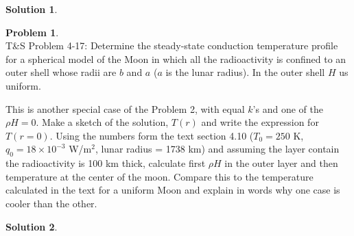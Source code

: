 \documentclass[titlepage, 11pt]{article}
\theoremstyle{definition}
\newtheorem{problem}{Problem}
\newtheorem*{solution}{Solution}
\begin{document}
\begin{solution}

\end{solution}

\newpage

\begin{problem}\ \\
T\&S Problem 4-17: Determine the steady-state conduction temperature profile for a spherical model of the Moon in which all the radioactivity is confined to an outer shell whose radii are $b$ and $a$ ($a$ is the lunar radius). In the outer shell $H$ us uniform.\vspace{\baselineskip}

\noindent
This is another special case of the Problem 2, with equal $k$'s and one of the $\rho H = 0$. Make a sketch of the solution, $T(r)$ and write the expression for $T(r = 0)$. Using the numbers form the text section 4.10 ($T_0 = 250$ K, $q_0 = 18\times{10}^{-3}$ W/m$^{2}$, lunar radius = 1738 km) and assuming the layer contain the radioactivity is 100 km thick, calculate first $\rho H$ in the outer layer and then temperature at the center of the moon. Compare this to the temperature calculated in the text for a uniform Moon and explain in words why one case is cooler than the other.
\end{problem}

\begin{solution}

\end{solution}
\end{document}
